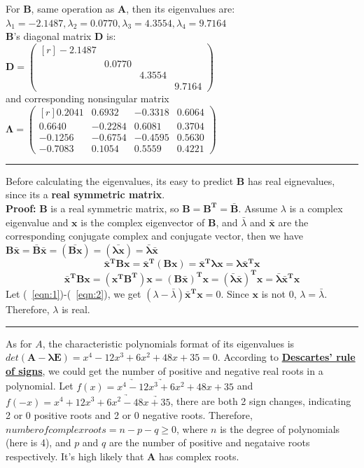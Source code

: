 \documentclass[a4paper,fleqn]{article}
\newcommand{\newvec}[1]{
    \begin{pmatrix*}[r]
        #1
    \end{pmatrix*}
}
\begin{document}
    \vspace{0.5cm}
    \noindent For $\mathbf{B}$, same operation as $\mathbf{A}$, then its eigenvalues are:\\
    $\lambda_1=-2.1487,\lambda_2=0.0770,\lambda_3=4.3554,\lambda_4=9.7164$ \\
    $\mathbf{B}$'s diagonal matrix $\mathbf{D}$ is: \\
    $\mathbf{D}=\newvec{-2.1487\\&0.0770\\&&4.3554\\&&&9.7164}$ \\
    and corresponding nonsingular matrix $\mathbf{\Lambda} = \newvec{0.2041&0.6932&-0.3318&0.6064\\0.6640&-0.2284&0.6081&0.3704\\-0.1256&-0.6754&-0.4595&0.5630\\-0.7083&0.1054&0.5559&0.4221}$\\
    \noindent\rule{\textwidth}{0.4pt}
    \noindent Before calculating the eigenvalues, its easy to predict $\mathbf{B}$ has real eignevalues, since its a \textbf{real symmetric matrix}. \\
    \textbf{Proof:} $\mathbf{B}$ is a real symmetric matrix, so $\mathbf{B}=\mathbf{B^T}=\mathbf{\bar{B}}$. Assume $\lambda$ is a complex eigenvalue and $\mathbf{x}$ is the complex eigenvector of $\mathbf{B}$, and $\bar{\lambda}$ and $\mathbf{\bar{x}}$ are the corresponding conjugate complex and conjugate vector, then we have \\
    $\mathbf{B\bar{x}=\bar{B}\bar{x}=(\bar{Bx})=(\bar{\lambda x})=\bar{\lambda}\bar{x}}$ 
    \begin{equation} \label{eqn:1}
        \mathbf{\bar{x}^TBx=\bar{x}^T(Bx)=\bar{x}^T\lambda x=\lambda \bar{x}^T x}
    \end{equation}
    \vspace{-1cm}
    \begin{equation} \label{eqn:2}
        \mathbf{\bar{x}^TBx=(x^TB^T)x=(B\bar{x})^Tx=(\bar{\lambda} \bar{x})^T x=\bar{\lambda} \bar{x}^T x}
    \end{equation}
    Let (~\ref{eqn:1})-(~\ref{eqn:2}), we get $(\lambda-\bar{\lambda})\mathbf{\bar{x}^Tx}=0$. Since $\mathbf{x}$ is not $0$, $\lambda = \bar{\lambda}$. Therefore, $\lambda$ is real. \\
    \noindent\rule{\textwidth}{0.4pt}
    \noindent As for $A$, the characteristic polynomials format of its eigenvalues is $det(\mathbf{A-\lambda E}) = x^4-12x^3+6x^2+48x+35=0$. According to \href{https://en.wikipedia.org/wiki/Descartes%27_rule_of_signs}{\textbf{Descartes' rule of signs}}, we could get the number of positive and negative real roots in a polynomial. Let $f(x)=\underrightarrow{x^4-12}\underrightarrow{x^3+6}x^2+48x+35$ and $f(-x)=x^4+12x^3+6\underrightarrow{x^2-48}\underrightarrow{x+35}$, there are both 2 sign changes, indicating 2 or 0 positive roots and 2 or 0 negative roots. Therefore, $number of complex roots = n-p-q \ge 0$, where $n$ is the degree of polynomials (here is 4), and $p$ and $q$ are the number of positive and negataive roots respectively. It's high likely that $\mathbf{A}$ has complex roots. 
\end{document}
